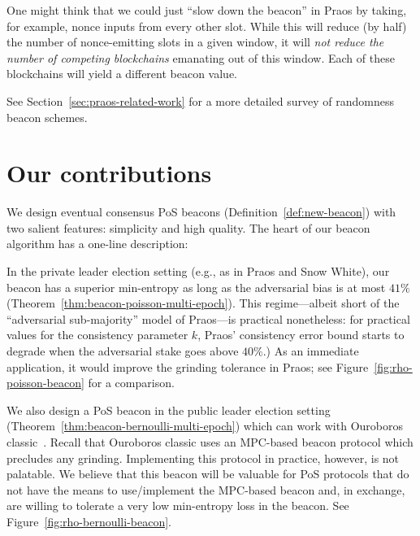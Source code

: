     One might think that we could just ``slow down the beacon'' in Praos 
    by taking, for example, nonce inputs from every other slot. 
    While this will reduce (by half) the number of nonce-emitting slots in a given window, 
    it will \emph{not reduce the number of competing blockchains} emanating out of this window. 
    Each of these blockchains will yield a different beacon value. 


    See Section~\ref{sec:praos-related-work} for 
    a more detailed survey of randomness beacon schemes.



\section{Our contributions}
    We design eventual consensus PoS beacons 
    (Definition~\ref{def:new-beacon}) 
    with two salient features: simplicity and high quality. 
    The heart of our beacon algorithm has a one-line description: 


    In the private leader election setting (e.g., as in Praos and Snow White), 
    our beacon has a superior min-entropy 
    as long as the adversarial bias is at most $41\%$ (Theorem~\ref{thm:beacon-poisson-multi-epoch}). 
    This regime---albeit short of the ``adversarial sub-majority'' model of Praos---is practical nonetheless: 
    for practical values for the consistency parameter $k$, 
    Praos' consistency error bound 
    starts to degrade when the adversarial stake goes above $40\%$.) 
    As an immediate application, it would improve the grinding tolerance in Praos; 
    see Figure~\ref{fig:rho-poisson-beacon} for a comparison.


    We also design a PoS beacon in the public leader election setting (Theorem~\ref{thm:beacon-bernoulli-multi-epoch})
    which can work with Ouroboros classic~\cite{Ouroboros}. 
    Recall that Ouroboros classic uses an MPC-based beacon protocol 
    which precludes any grinding. 
    Implementing this protocol in practice, however, is not palatable. 
    We believe that this beacon will be valuable for 
    PoS protocols 
    that do not have the means to use/implement the MPC-based beacon 
    and, in exchange, are willing to tolerate a very low min-entropy loss 
    in the beacon. 
    See Figure~\ref{fig:rho-bernoulli-beacon}.


